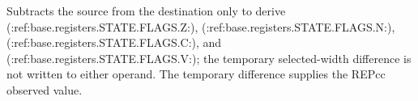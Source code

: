 Subtracts the source from the destination only to derive (:ref:base.registers.STATE.FLAGS.Z:), (:ref:base.registers.STATE.FLAGS.N:), (:ref:base.registers.STATE.FLAGS.C:), and (:ref:base.registers.STATE.FLAGS.V:); the temporary selected-width difference is not written to either operand. The temporary difference supplies the REPcc observed value.
